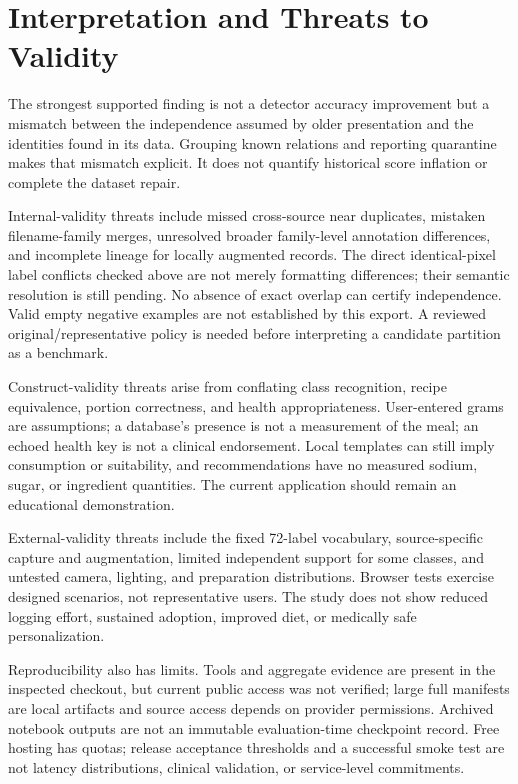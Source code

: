 \documentclass[12pt,journal,draftclsnofoot,onecolumn]{IEEEtran}
\begin{document}
\section{Interpretation and Threats to Validity}
The strongest supported finding is not a detector accuracy improvement but a mismatch between the independence assumed by older presentation and the identities found in its data. Grouping known relations and reporting quarantine makes that mismatch explicit. It does not quantify historical score inflation or complete the dataset repair.

Internal-validity threats include missed cross-source near duplicates, mistaken filename-family merges, unresolved broader family-level annotation differences, and incomplete lineage for locally augmented records. The direct identical-pixel label conflicts checked above are not merely formatting differences; their semantic resolution is still pending. No absence of exact overlap can certify independence. Valid empty negative examples are not established by this export. A reviewed original/representative policy is needed before interpreting a candidate partition as a benchmark.

Construct-validity threats arise from conflating class recognition, recipe equivalence, portion correctness, and health appropriateness. User-entered grams are assumptions; a database's presence is not a measurement of the meal; an echoed health key is not a clinical endorsement. Local templates can still imply consumption or suitability, and recommendations have no measured sodium, sugar, or ingredient quantities. The current application should remain an educational demonstration.

External-validity threats include the fixed 72-label vocabulary, source-specific capture and augmentation, limited independent support for some classes, and untested camera, lighting, and preparation distributions. Browser tests exercise designed scenarios, not representative users. The study does not show reduced logging effort, sustained adoption, improved diet, or medically safe personalization.

Reproducibility also has limits. Tools and aggregate evidence are present in the inspected checkout, but current public access was not verified; large full manifests are local artifacts and source access depends on provider permissions. Archived notebook outputs are not an immutable evaluation-time checkpoint record. Free hosting has quotas; release acceptance thresholds and a successful smoke test are not latency distributions, clinical validation, or service-level commitments.
\end{document}
